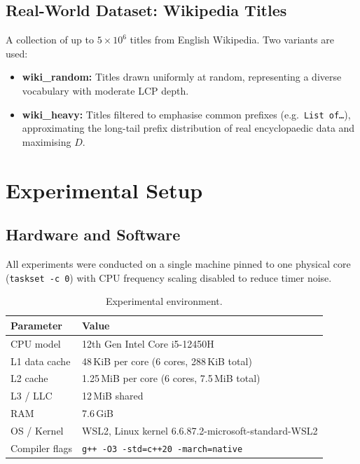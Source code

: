 \documentclass{article}
\begin{document}
\subsection{Real-World Dataset: Wikipedia Titles}
A collection of up to $5 \times 10^6$ titles from English Wikipedia.
Two variants are used:
\begin{itemize}
  \item \textbf{wiki\_random:} Titles drawn uniformly at random, representing a
        diverse vocabulary with moderate LCP depth.
  \item \textbf{wiki\_heavy:} Titles filtered to emphasise common prefixes
        (e.g.\ \texttt{List of\ldots}), approximating the long-tail prefix
        distribution of real encyclopaedic data and maximising $D$.
\end{itemize}

\section{Experimental Setup}

\subsection{Hardware and Software}

All experiments were conducted on a single machine pinned to one physical core
(\texttt{taskset -c~0}) with CPU frequency scaling disabled to reduce timer
noise.

\begin{table}[h]
\centering
\caption{Experimental environment.}
\label{tab:hw}
\begin{tabular}{@{}ll@{}}
\toprule
Parameter          & Value \\ \midrule
CPU model          & 12th Gen Intel Core i5-12450H \\
L1 data cache      & 48\,KiB per core (6 cores, 288\,KiB total) \\
L2 cache           & 1.25\,MiB per core (6 cores, 7.5\,MiB total) \\
L3 / LLC           & 12\,MiB shared \\
RAM                & 7.6\,GiB \\
OS / Kernel        & WSL2, Linux kernel 6.6.87.2-microsoft-standard-WSL2 \\
Compiler flags     & \texttt{g++ -O3 -std=c++20 -march=native} \\
\bottomrule
\end{tabular}
\end{table}
\end{document}
